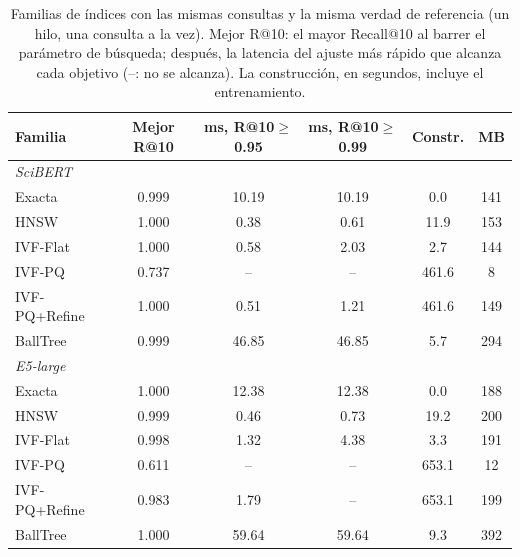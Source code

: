 \begin{table}[tbp]
\caption{Familias de índices con las mismas consultas y la misma verdad de referencia (un hilo, una consulta a la vez). Mejor R@10: el mayor Recall@10 al barrer el parámetro de búsqueda; después, la latencia del ajuste más rápido que alcanza cada objetivo (--: no se alcanza). La construcción, en segundos, incluye el entrenamiento.}\label{tab:familias}
\centering
\small
\begin{tabular}{|l|c|c|c|c|c|}
\hline
\textbf{Familia} & \textbf{Mejor R@10} & \textbf{ms, R@10$\geq$0.95} & \textbf{ms, R@10$\geq$0.99} & \textbf{Constr.} & \textbf{MB} \\
\hline
\multicolumn{6}{|l|}{\textit{SciBERT}} \\
Exacta & 0.999 & 10.19 & 10.19 & 0.0 & 141 \\
HNSW & 1.000 & 0.38 & 0.61 & 11.9 & 153 \\
IVF-Flat & 1.000 & 0.58 & 2.03 & 2.7 & 144 \\
IVF-PQ & 0.737 & -- & -- & 461.6 & 8 \\
IVF-PQ+Refine & 1.000 & 0.51 & 1.21 & 461.6 & 149 \\
BallTree & 0.999 & 46.85 & 46.85 & 5.7 & 294 \\
\multicolumn{6}{|l|}{\textit{E5-large}} \\
Exacta & 1.000 & 12.38 & 12.38 & 0.0 & 188 \\
HNSW & 0.999 & 0.46 & 0.73 & 19.2 & 200 \\
IVF-Flat & 0.998 & 1.32 & 4.38 & 3.3 & 191 \\
IVF-PQ & 0.611 & -- & -- & 653.1 & 12 \\
IVF-PQ+Refine & 0.983 & 1.79 & -- & 653.1 & 199 \\
BallTree & 1.000 & 59.64 & 59.64 & 9.3 & 392 \\
\hline
\end{tabular}
\end{table}
